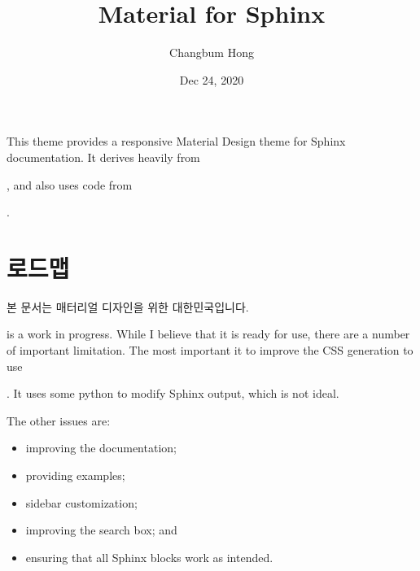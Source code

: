 \documentclass[letterpaper,10pt,english]{sphinxmanual}
\title{Material for Sphinx}
\date{Dec 24, 2020}
\author{Changbum Hong}
\begin{document}
\pagestyle{empty}
\sphinxmaketitle
\pagestyle{plain}
\sphinxtableofcontents
\pagestyle{normal}
\label{\detokenize{index::doc}}


\noindent{}

This theme provides a responsive Material Design theme for Sphinx
documentation. It derives heavily from
%
\begin{footnote}[1]\sphinxAtStartFootnote
{}
%
\end{footnote},
and also uses code from
%
\begin{footnote}[2]\sphinxAtStartFootnote
{}
%
\end{footnote}.


\chapter{로드맵}
\label{\detokenize{index:id1}}
본 문서는 매터리얼 디자인을 위한 대한민국입니다.
%
\begin{footnote}[3]\sphinxAtStartFootnote
{}
%
\end{footnote} is a work in progress.  While
I believe that it is ready for use, there are a number of important limitation.  The most
important it to improve the CSS generation to use
%
\begin{footnote}[4]\sphinxAtStartFootnote
{}
%
\end{footnote}. It uses some python to
modify Sphinx output, which is not ideal.

The other issues are:
\begin{itemize}
\item {} 
improving the documentation;

\item {} 
providing examples;

\item {} 
sidebar customization;

\item {} 
improving the search box; and

\item {} 
ensuring that all Sphinx blocks work as intended.

\end{itemize}
\end{document}
